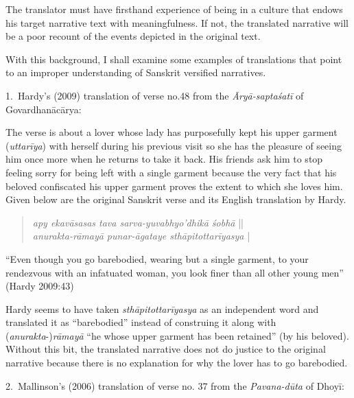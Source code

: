 The translator must have firsthand experience of being in a culture that endows his target narrative text with meaningfulness. If not, the translated narrative will be a poor recount of the events depicted in the original text. 

With this background, I shall examine some examples of translations that point to an improper understanding of Sanskrit versified narratives.  


1.~Hardy’s (2009) translation of verse no.\@ 48 from the \textsl{Āryā-saptaśatī} of Govardhanācārya: 

The verse is about a lover whose lady has purposefully kept his upper garment (\textsl{uttarīya}) with herself during his previous visit so she has the pleasure of seeing him once more when he returns to take it back. His friends ask him to stop feeling sorry for being left with a single garment because the very fact that his beloved confiscated his upper garment proves the extent to which she loves him. Given below are the original Sanskrit verse and its English translation by Hardy. 
\begin{quote}
\textsl{apy ekavāsasas tava sarva-yuvabhyo’dhikā śobhā}  ||\\
\textsl{anurakta-rāmayā punar-āgataye sthāpitottarīyasya} |
\end{quote}

\begin{myquote}
“Even though you go barebodied, wearing but a single garment, to your rendezvous with an infatuated woman, you look finer than all other young men” 
\hfill(Hardy 2009:43)
\end{myquote}

Hardy seems to have taken \textsl{sthāpitottarīyasya }as an independent word and translated it as “barebodied” instead of construing it along with (\textsl{anurakta}-)\textsl{rāmayā}  “he whose upper garment has been retained” (by his beloved). Without this bit, the translated narrative does not do justice to the original narrative because there is no explanation for why the lover has to go barebodied.

2.~Mallinson’s (2006) translation of verse no. 37 from the \textsl{Pavana-dūta} of Dhoyī:  

